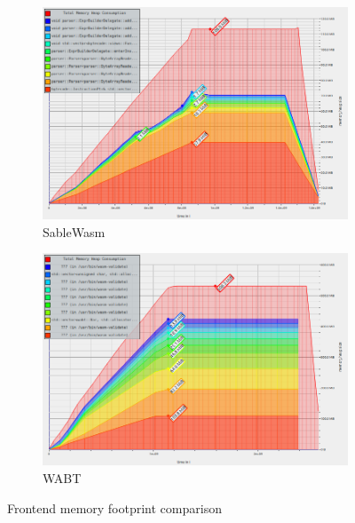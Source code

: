 \begin{figure}
  \centering
  \begin{subfigure}[t]{0.87\textwidth}
    \includegraphics[width=\textwidth]{Images/sablewasm-validate-memory.png}
    \caption{SableWasm}\label{fig:sablewasm-eval-memory-sablewasm}
  \end{subfigure}
  \begin{subfigure}[t]{0.87\textwidth}
    \includegraphics[width=\textwidth]{Images/wabt-validate-memory.png}
    \caption{WABT}\label{fig:sablewasm-eval-memory-wabt}
  \end{subfigure}
  \caption{Frontend memory footprint comparison}
  \label{fig:sablewasm-eval-memory}
\end{figure}

